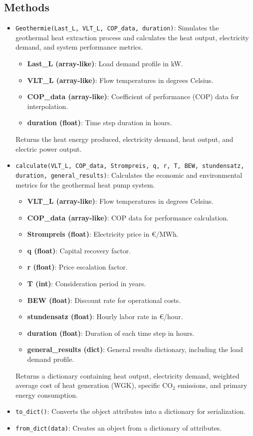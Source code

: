 \subsection{Methods}
\begin{itemize}
    \item \texttt{Geothermie(Last\_L, VLT\_L, COP\_data, duration)}: Simulates the geothermal heat extraction process and calculates the heat output, electricity demand, and system performance metrics.
    \begin{itemize}
        \item \textbf{Last\_L (array-like)}: Load demand profile in kW.
        \item \textbf{VLT\_L (array-like)}: Flow temperatures in degrees Celsius.
        \item \textbf{COP\_data (array-like)}: Coefficient of performance (COP) data for interpolation.
        \item \textbf{duration (float)}: Time step duration in hours.
    \end{itemize}
    Returns the heat energy produced, electricity demand, heat output, and electric power output.

    \item \texttt{calculate(VLT\_L, COP\_data, Strompreis, q, r, T, BEW, stundensatz, duration, general\_results)}: Calculates the economic and environmental metrics for the geothermal heat pump system.
    \begin{itemize}
        \item \textbf{VLT\_L (array-like)}: Flow temperatures in degrees Celsius.
        \item \textbf{COP\_data (array-like)}: COP data for performance calculation.
        \item \textbf{Strompreis (float)}: Electricity price in €/MWh.
        \item \textbf{q (float)}: Capital recovery factor.
        \item \textbf{r (float)}: Price escalation factor.
        \item \textbf{T (int)}: Consideration period in years.
        \item \textbf{BEW (float)}: Discount rate for operational costs.
        \item \textbf{stundensatz (float)}: Hourly labor rate in €/hour.
        \item \textbf{duration (float)}: Duration of each time step in hours.
        \item \textbf{general\_results (dict)}: General results dictionary, including the load demand profile.
    \end{itemize}
    Returns a dictionary containing heat output, electricity demand, weighted average cost of heat generation (WGK), specific CO$_2$ emissions, and primary energy consumption.

    \item \texttt{to\_dict()}: Converts the object attributes into a dictionary for serialization.
    
    \item \texttt{from\_dict(data)}: Creates an object from a dictionary of attributes.
\end{itemize}

